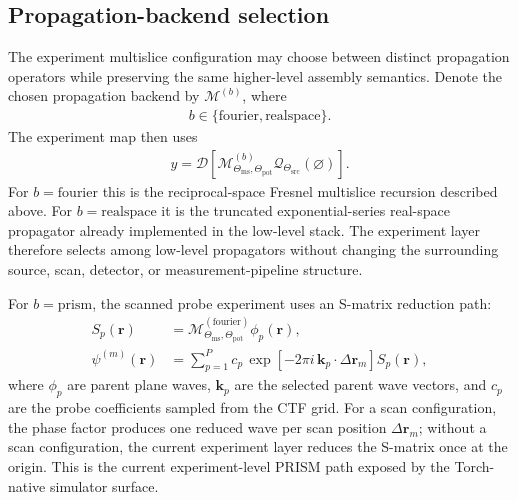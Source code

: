 \documentclass[11pt]{article}
\begin{document}
\subsection{Propagation-backend selection}
The experiment multislice configuration may choose between distinct propagation
operators while preserving the same higher-level assembly semantics.  Denote the chosen
propagation backend by $\mathcal{M}^{(b)}$, where
\begin{align}
  b \in \{\text{fourier}, \text{realspace}\}.
\end{align}
The experiment map then uses
\begin{align}
  y = \mathcal{D}\!\left[
    \mathcal{M}^{(b)}_{\Theta_{\mathrm{ms}},\Theta_{\mathrm{pot}}}
    \mathcal{Q}_{\Theta_{\mathrm{src}}}(\varnothing)
  \right].
\end{align}
For $b=\text{fourier}$ this is the reciprocal-space Fresnel multislice recursion
described above.  For $b=\text{realspace}$ it is the truncated exponential-series
real-space propagator already implemented in the low-level stack.  The experiment layer
therefore selects among low-level propagators without changing the surrounding source,
scan, detector, or measurement-pipeline structure.

For $b=\text{prism}$, the scanned probe experiment uses an S-matrix reduction path:
\begin{align}
  S_p(\mathbf{r})
  &=
  \mathcal{M}^{(\text{fourier})}_{\Theta_{\mathrm{ms}},\Theta_{\mathrm{pot}}}
  \phi_p(\mathbf{r}), \\
  \psi^{(m)}(\mathbf{r})
  &= \sum_{p=1}^{P}
    c_p \,
    \exp\!\left[
      -2\pi i \,
      \mathbf{k}_p \cdot \Delta \mathbf{r}_m
    \right]
    S_p(\mathbf{r}),
\end{align}
where $\phi_p$ are parent plane waves, $\mathbf{k}_p$ are the selected parent wave
vectors, and $c_p$ are the probe coefficients sampled from the CTF grid.  For a scan
configuration, the phase factor produces one reduced wave per scan position
$\Delta \mathbf{r}_m$; without a scan configuration, the current experiment layer
reduces the S-matrix once at the origin. This is the current experiment-level PRISM
path exposed by the Torch-native simulator surface.
\end{document}
